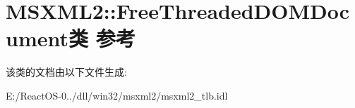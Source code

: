 \hypertarget{class_m_s_x_m_l2_1_1_free_threaded_d_o_m_document}{}\section{M\+S\+X\+M\+L2\+:\+:Free\+Threaded\+D\+O\+M\+Document类 参考}
\label{class_m_s_x_m_l2_1_1_free_threaded_d_o_m_document}


该类的文档由以下文件生成\+:\begin{DoxyCompactItemize}
\item 
E\+:/\+React\+O\+S-\/0../dll/win32/msxml2/msxml2\+\_\+tlb.\+idl\end{DoxyCompactItemize}
